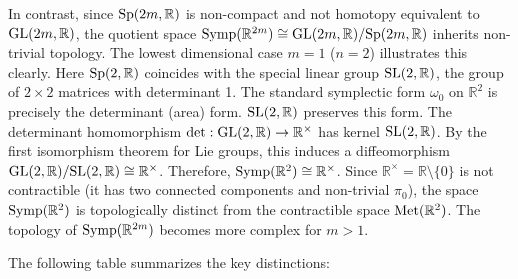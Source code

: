 In contrast, since $\mathrm{Sp}(2m, \mathbb{R})$ is non-compact and not homotopy equivalent to $\mathrm{GL}(2m, \mathbb{R})$, the quotient space $\operatorname{Symp}(\mathbb{R}^{2m}) \cong \mathrm{GL}(2m, \mathbb{R}) / \mathrm{Sp}(2m, \mathbb{R})$ inherits non-trivial topology. The lowest dimensional case $m=1$ ($n=2$) illustrates this clearly. Here $\mathrm{Sp}(2, \mathbb{R})$ coincides with the special linear group $\mathrm{SL}(2, \mathbb{R})$, the group of $2 \times 2$ matrices with determinant 1. The standard symplectic form $\omega_0$ on $\mathbb{R}^2$ is precisely the determinant (area) form. $\mathrm{SL}(2, \mathbb{R})$ preserves this form. The determinant homomorphism $\det: \mathrm{GL}(2, \mathbb{R}) \to \mathbb{R}^\times$ has kernel $\mathrm{SL}(2, \mathbb{R})$. By the first isomorphism theorem for Lie groups, this induces a diffeomorphism $\mathrm{GL}(2, \mathbb{R}) / \mathrm{SL}(2, \mathbb{R}) \cong \mathbb{R}^\times$. Therefore, $\operatorname{Symp}(\mathbb{R}^2) \cong \mathbb{R}^\times$. Since $\mathbb{R}^\times = \mathbb{R} \setminus \{0\}$ is not contractible (it has two connected components and non-trivial $\pi_0$), the space $\operatorname{Symp}(\mathbb{R}^2)$ is topologically distinct from the contractible space $\operatorname{Met}(\mathbb{R}^2)$. The topology of $\operatorname{Symp}(\mathbb{R}^{2m})$ becomes more complex for $m > 1$.

The following table summarizes the key distinctions:

